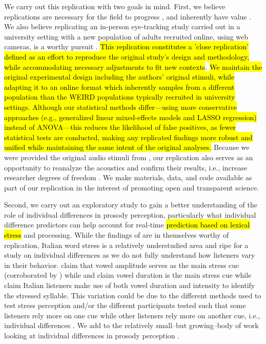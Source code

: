 We carry out this replication with two goals in mind. First, we believe replications are necessary for the field to progress \citep{Rakosi2017}, and inherently have value \citep{Kobrock2023}. We also believe replicating an in-person eye-tracking study carried out in a university setting with a new population of adults recruited online, using web cameras, is a worthy pursuit \citep{Prystauka_Altmann_Rothman_2023}. \hl{This replication constitutes a 'close replication' 
defined as an effort to reproduce the original study's design and methodology, while accommodating necessary adjustments to fit new contexts}\citep{mcmanus2022replication}. \hl{We maintain the original experimental design including the authors' original stimuli, while adapting it to an online format which inherently samples from a different population than the WEIRD populations typically recruited in university settings. Although our statistical methods differ—using more conservative approaches (e.g., generalized linear mixed-effects models and LASSO regression) instead of ANOVA—this reduces the likelihood of false positives, as fewer statistical tests are conducted, making any replicated findings more robust and unified while maintaining the same intent of the original analyses.} Because we were provided the original audio stimuli from \cite{Sulpizio_McQueen_2012}, our replication also serves as an opportunity to reanalyze the acoustics and confirm their results, i.e., increase researcher degrees of freedom \citep{Corretta2023}. We make materials, data, and code available as part of our replication in the interest of promoting open and transparent science.

Second, we carry out an exploratory study to gain a better understanding of the role of individual differences in prosody perception, particularly what individual difference predictors can help account for real-time \hl{prediction based on lexical stress} and processing. While the findings of \cite{Sulpizio_McQueen_2012} are in themselves worthy of replication, Italian word stress is a relatively understudied area and ripe for a study on individual differences as we do not fully understand how listeners vary in their behavior. \cite{Maturi1998} claim that vowel amplitude serves as the main stress cue (corroborated by \cite{Sulpizio_McQueen_2012}) while \cite{Alfano2006} and \cite{Alfano2009} claim vowel duration is the main stress cue while \cite{Tagliapietra2005} claim Italian listeners make use of both vowel duration and intensity to identify the stressed syllable. This variation could be due to the different methods used to test stress perception and/or the different participants tested such that some listeners rely more on one cue while other listeners rely more on another cue, i.e., individual differences  \citep{Yu2019, Kidd2018}. We add to the relatively small--but growing--body of work looking at individual differences in prosody perception \citep[e.g.,][]{Roy2017, Bishop2017, Lameris2023, Sinagra2022}.

